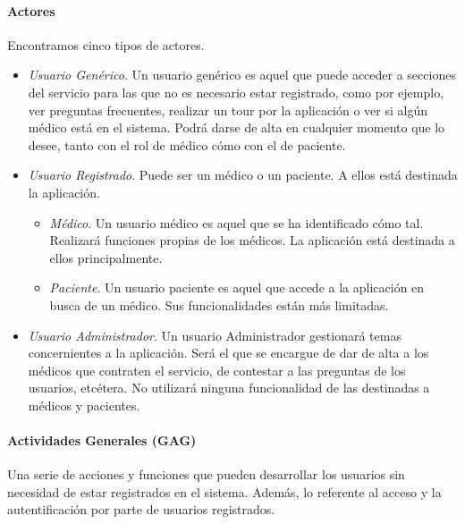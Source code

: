 			\paragraph{Actores} %
			\label{sub:actores}
				Encontramos cinco tipos de actores.
				\begin{itemize}
					\item \textit{Usuario Genérico}. Un usuario genérico es aquel que puede acceder a secciones del servicio para las que no es necesario estar registrado, como por ejemplo, ver preguntas frecuentes, realizar un tour por la aplicación o ver si algún médico está en el sistema. Podrá darse de alta en cualquier momento que lo desee, tanto con el rol de médico cómo con el de paciente.
					\item \textit{Usuario Registrado}. Puede ser un médico o un paciente. A ellos está destinada la aplicación.
						\begin{itemize}
							\item \textit{Médico}. Un usuario médico es aquel que se ha identificado cómo tal. Realizará funciones propias de los médicos. La aplicación está destinada a ellos principalmente.
							\item \textit{Paciente}. Un usuario paciente es aquel que accede a la aplicación en busca de un médico. Sus funcionalidades están más limitadas.
						\end{itemize}
					\item \textit{Usuario Administrador}. Un usuario Administrador gestionará temas concernientes a la aplicación. Será el que se encargue de dar de alta a los médicos que contraten el servicio, de contestar a las preguntas de los usuarios, etcétera. No utilizará ninguna funcionalidad de las destinadas a médicos y pacientes.
					 
				\end{itemize}
			\newpage
			\paragraph{Actividades Generales (GAG)} %
			\label{sub:actividades_generales_gag_}
			
				Una serie de acciones y funciones que pueden desarrollar los usuarios sin necesidad de estar registrados en el sistema. Además, lo referente al acceso y la autentificación por parte de usuarios registrados.
				\bigskip
			
